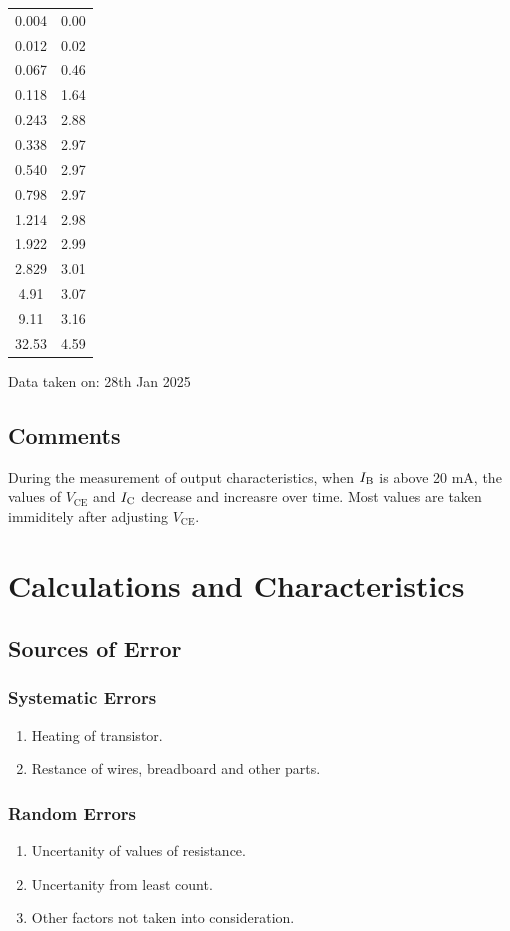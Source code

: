 \documentclass[%
sor,
 jor,
 amsmath,amssymb,
 reprint,
]{revtex4-2}
\begin{document}
\begin{center}
\begin{minipage}{0.31\linewidth}
\begin{tabular}{|c|c|}
\hline
0.004 & 0.00 \\
0.012 & 0.02 \\
0.067 & 0.46 \\
0.118 & 1.64 \\
0.243 & 2.88 \\
0.338 & 2.97 \\
0.540 & 2.97 \\
0.798 & 2.97 \\
1.214 & 2.98 \\
1.922 & 2.99 \\
2.829 & 3.01 \\
4.91 & 3.07 \\
9.11 & 3.16 \\
32.53 & 4.59 \\
\hline
\end{tabular}
\end{minipage}
\end{center}
\begin{center}
Data taken on: 28th Jan 2025 
\end{center}
\subsection{Comments}
During the measurement of output characteristics, when $I_\text B$ is above 20 mA, the values of $V_\text{CE}$ and $I_\text C$ decrease and increasre over time. Most values are taken immiditely after adjusting $V_\text{CE}$.


\section{Calculations and Characteristics}
\subsection{Sources of Error}
\subsubsection{Systematic Errors}
\begin{enumerate}
	\item Heating of transistor.
	\item Restance of wires, breadboard and other parts.
\end{enumerate}

\subsubsection{Random Errors}
\begin{enumerate}
	\item Uncertanity of values of resistance.
	\item Uncertanity from least count.
	\item Other factors not taken into consideration.
\end{enumerate}
\end{document}
